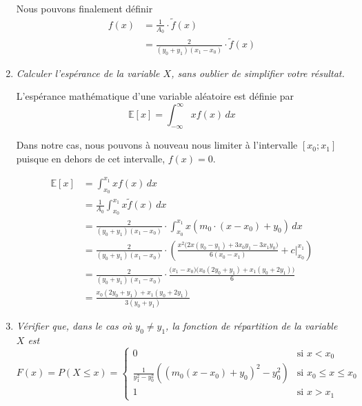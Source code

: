 \documentclass[a4paper,11pt]{report}
\begin{document}
\begin{enumerate}[\indent a)]
Nous pouvons finalement définir
\begin{align*}
	f(x) &= \frac{1}{A_0} \cdot  \tilde{f}(x) \\
	     &= \frac{2}{(y_0 + y_1)(x_1 - x_0)} \cdot \tilde{f}(x)
\end{align*}

\item {\em Calculer l'espérance de la variable $X$, sans oublier de simplifier votre résultat.}

L'espérance mathématique d'une variable aléatoire est définie par
\begin{equation*}
	\mathbb{E}[x] = \int_{-\infty}^{\infty} x f(x) \,dx
\end{equation*}

Dans notre cas, nous pouvons à nouveau nous limiter à l'intervalle $[x_{0}; x_{1}]$ puisque en dehors de cet intervalle, $f(x)=0$.

\begingroup
\addtolength{\jot}{1em}
\begin{align*}
\mathbb{E}[x] &= \int_{x_0}^{x_1} x f(x) \,dx \\
	&= \frac{1}{A_0} \int_{x_0}^{x_1} x \tilde{f}(x) \,dx \\
	&= \frac{2}{(y_0 + y_1)(x_1 - x_0)} \cdot \int_{x_0}^{x_1} x (m_0 \cdot (x - x_0) + y_0) \,dx \\
	&= \frac{2}{(y_0 + y_1)(x_1 - x_0)} \cdot \left( \frac{x^2 \big(2x (y_0-y_1) + 3 x_0 y_1 - 3 x_1 y_0\big)}{6 (x_0-x_1)}+c \biggr\rvert^{x_1}_{x_0} \right) \\
	&= \frac{2}{(y_0 + y_1)(x_1 - x_0)} \cdot \frac{\big(x_1-x_0\big) \big(x_0 (2 y_0+y_1)+x_1 (y_0+2 y_1)\big)}{6} \\
	&= \frac{x_0 (2y_0 + y_1) + x_1 (y_0 + 2y_1)}{3 (y_0+y_1)}
\end{align*}
\endgroup

\item {\em Vérifier que, dans le cas où $y_{0} \neq y_{1}$, la fonction de répartition de la variable $X$ est}
\begin{equation*}
	F(x) = P(X \leq x) = \left\lbrace \begin{array}{ll}
		0						& \text{si $x < x_0$} \\
		\frac{1}{y^2_1 - y^2_0} \left( \left( m_0 \left( x - x_0 \right) + y_0 \right)^2 - y^2_0 \right)	& \text{si $x_0 \leq x \leq x_0$} \\
		1 						& \text{si $x > x_1$}
	\end{array} \right.
\end{equation*}


\end{enumerate}
\end{document}
